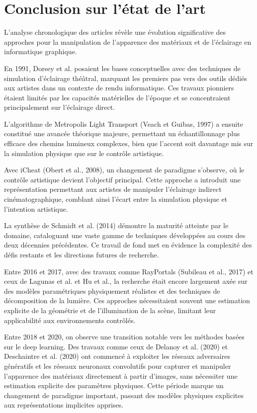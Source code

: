\documentclass{article}
\begin{document}
\newpage
\section{Conclusion sur l'état de l'art}

L'analyse chronologique des articles révèle une évolution significative des approches pour la manipulation de l'apparence des matériaux et de l'éclairage en informatique graphique.

En 1991, Dorsey et al. posaient les bases conceptuelles avec des techniques de simulation d'éclairage théâtral, marquant les premiers pas vers des outils dédiés aux artistes dans un contexte de rendu informatique. Ces travaux pionniers étaient limités par les capacités matérielles de l'époque et se concentraient principalement sur l'éclairage direct.

L'algorithme de Metropolis Light Transport (Veach et Guibas, 1997) a ensuite constitué une avancée théorique majeure, permettant un échantillonnage plus efficace des chemins lumineux complexes, bien que l'accent soit davantage mis sur la simulation physique que sur le contrôle artistique.

Avec iCheat (Obert et al., 2008), un changement de paradigme s'observe, où le contrôle artistique devient l'objectif principal. Cette approche a introduit une représentation permettant aux artistes de manipuler l'éclairage indirect cinématographique, comblant ainsi l'écart entre la simulation physique et l'intention artistique.

La synthèse de Schmidt et al. (2014) démontre la maturité atteinte par le domaine, cataloguant une vaste gamme de techniques développées au cours des deux décennies précédentes. Ce travail de fond met en évidence la complexité des défis restants et les directions futures de recherche.

Entre 2016 et 2017, avec des travaux comme RayPortals (Subileau et al., 2017) et ceux de Lagunas et al. et Hu et al., la recherche était encore largement axée sur des modèles paramétriques physiquement réalistes et des techniques de décomposition de la lumière. Ces approches nécessitaient souvent une estimation explicite de la géométrie et de l'illumination de la scène, limitant leur applicabilité aux environnements contrôlés.

Entre 2018 et 2020, on observe une transition notable vers les méthodes basées sur le deep learning. Des travaux comme ceux de Delanoy et al. (2020) et Deschaintre et al. (2020) ont commencé à exploiter les réseaux adversaires génératifs et les réseaux neuronaux convolutifs pour capturer et manipuler l'apparence des matériaux directement à partir d'images, sans nécessiter une estimation explicite des paramètres physiques. Cette période marque un changement de paradigme important, passant des modèles physiques explicites aux représentations implicites apprises.
\end{document}

